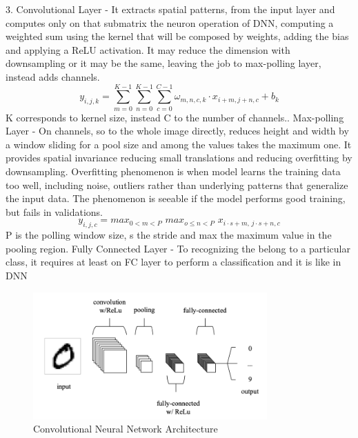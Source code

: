 3. Convolutional Layer - It extracts spatial patterns, from the input layer and computes only on that submatrix the neuron operation of DNN, computing a weighted sum using the kernel that will be composed by weights, adding the bias and applying a ReLU activation. It may reduce the dimension with downsampling or it may be the same, leaving the job to max-polling layer, instead adds channels.\newline
\begin{equation}
    y_{i,j,k}=\sum_{m=0}^{K-1}\sum_{n=0}^{K-1}\sum_{c=0}^{C-1}\omega_{m,n,c,k}\cdot x_{i+m,j+n,c}+b_k
\end{equation}
K corresponds to kernel size, instead C to the number of channels.. Max-polling Layer - On channels, so to the whole image directly, reduces height and width by a window sliding for a pool size and among the values takes the maximum one. It provides spatial invariance reducing small translations and reducing overfitting by downsampling. Overfitting phenomenon is when model learns the training data too well, including noise, outliers rather than underlying patterns that generalize the input data. The phenomenon is seeable if the model performs good training, but fails in validations.
\begin{equation}
    y_{i,j,c}=max_{0<m<P}\,\,max_{o\leq n<P}\,\,x_{i\cdot s+m,\,j\cdot s+n,c}
\end{equation}
P is the polling window size, s the stride and max the maximum value in the pooling region. Fully Connected Layer - To recognizing the belong to a particular class, it requires at least on FC layer to perform a classification and it is like in DNN\newline 
\begin{center}
    \begin{figure}[!h]
        \centering
        \includegraphics[width=0.8\textwidth]{images/2.06 Convolutional Neural Network.png}
        \caption{Convolutional Neural Network Architecture}
    \end{figure}
\end{center}
